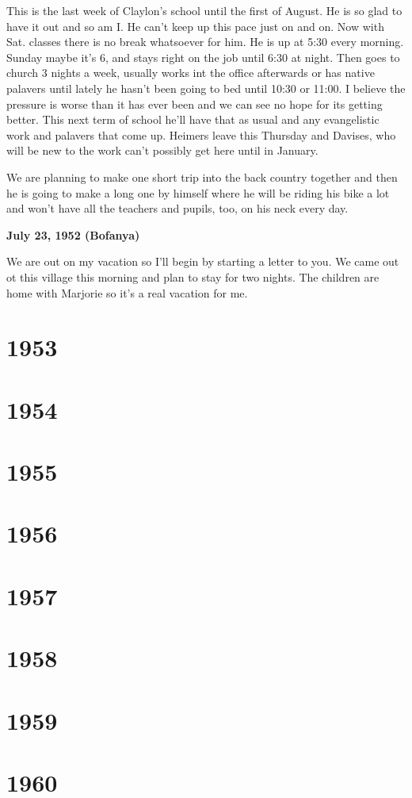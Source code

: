 \documentclass[]{book}
\begin{document}
This is the last week of Claylon's school until the first of August. He is so glad to have it out and so am I. He can't keep up this pace just on and on. Now with Sat. classes there is no break whatsoever for him. He is up at 5:30 every morning. Sunday maybe it's 6, and stays right on the job until 6:30 at night. Then goes to church 3 nights a week, usually works int the office afterwards or has native palavers until lately he hasn't been going to bed until 10:30 or 11:00. I believe the pressure is worse than it has ever been and we can see no hope for its getting better. This next term of school he'll have that as usual and any evangelistic work and palavers that come up. Heimers leave this Thursday and Davises, who will be new to the work can't possibly get here until in January.

We are planning to make one short trip into the back country together and then he is going to make a long one by himself where he will be riding his bike a lot and won't have all the teachers and pupils, too, on his neck every day.

\textbf{July 23, 1952 (Bofanya)}

We are out on my vacation so I'll begin by starting a letter to you. We came out ot this village this morning and plan to stay for two nights. The children are home with Marjorie so it's a real vacation for me.

\hypertarget{section-4}{%
\chapter{1953}\label{section-4}}

\hypertarget{section-5}{%
\chapter{1954}\label{section-5}}

\hypertarget{section-6}{%
\chapter{1955}\label{section-6}}

\hypertarget{section-7}{%
\chapter{1956}\label{section-7}}

\hypertarget{section-8}{%
\chapter{1957}\label{section-8}}

\hypertarget{section-9}{%
\chapter{1958}\label{section-9}}

\hypertarget{section-10}{%
\chapter{1959}\label{section-10}}

\hypertarget{section-11}{%
\chapter{1960}\label{section-11}}


\end{document}
